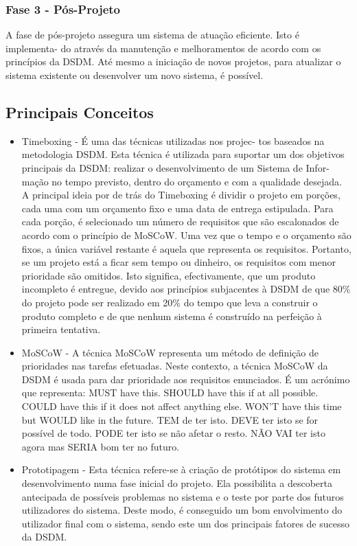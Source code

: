 \subsubsection{Fase 3 - Pós-Projeto}

A fase de pós-projeto assegura um sistema de atuação eficiente. Isto é implementa- do através da manutenção e melhoramentos de acordo com os princípios da DSDM. Até mesmo a iniciação de novos projetos, para atualizar o sistema existente ou desenvolver um novo sistema, é possível.

\subsection{Principais Conceitos}

\begin{itemize}
    \item Timeboxing - É uma das técnicas utilizadas nos projec- tos baseados na metodologia DSDM. Esta técnica é utilizada para suportar um dos objetivos principais da DSDM: realizar o desenvolvimento de um Sistema de Infor- mação no tempo previsto, dentro do orçamento e com a qualidade desejada. A principal ideia por de trás do Timeboxing é dividir o projeto em porções, cada uma com um orçamento fixo e uma data de entrega estipulada. Para cada porção, é selecionado um número de requisitos que são escalonados de acordo com o princípio de MoSCoW. Uma vez que o tempo e o orçamento são fixos, a única variável restante é aquela que representa os requisitos. Portanto, se um projeto está a ficar sem tempo ou dinheiro, os requisitos com menor prioridade são omitidos. Isto significa, efectivamente, que um produto incompleto é entregue, devido aos princípios subjacentes à DSDM de que 80\% do projeto pode ser realizado em 20\% do tempo que leva a construir o produto completo e de que nenhum sistema é construído na perfeição à primeira tentativa.
    \item MoSCoW - A técnica MoSCoW representa um método de definição de prioridades nas tarefas efetuadas. Neste contexto, a técnica MoSCoW da DSDM é usada para dar prioridade aos requisitos enunciados. É um acrónimo que representa:
MUST have this.
SHOULD have this if at all possible.
COULD have this if it does not affect anything else. WON'T have this time but WOULD like in the future.
TEM de ter isto.
DEVE ter isto se for possível de todo.
PODE ter isto se não afetar o resto.
NÃO VAI ter isto agora mas SERIA bom ter no futuro.
    \item Prototipagem - Esta técnica refere-se à criação de protótipos do sistema em desenvolvimento numa fase inicial do projeto. Ela possibilita a descoberta antecipada de possíveis problemas no sistema e o teste por parte dos futuros utilizadores do sistema. Deste modo, é conseguido um bom envolvimento do utilizador final com o sistema, sendo este um dos principais fatores de sucesso da DSDM.

\end{itemize}
